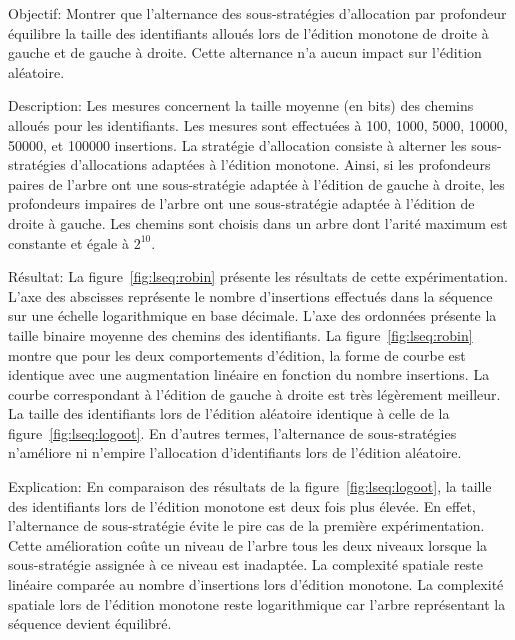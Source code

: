 \begin{asparadesc}
\item [Objectif:] Montrer que l'alternance des sous-stratégies d'allocation par
  profondeur équilibre la taille des identifiants alloués lors de l'édition
  monotone de droite à gauche et de gauche à droite. Cette alternance n'a aucun
  impact sur l'édition aléatoire.
\item [Description:] Les mesures concernent la taille moyenne (en bits) des
  chemins alloués pour les identifiants. Les mesures sont effectuées à 100,
  1000, 5000, 10000, 50000, et 100000 insertions. La stratégie d'allocation
  consiste à alterner les sous-stratégies d'allocations adaptées à l'édition
  monotone. Ainsi, si les profondeurs paires de l'arbre ont une sous-stratégie
  adaptée à l'édition de gauche à droite, les profondeurs impaires de l'arbre
  ont une sous-stratégie adaptée à l'édition de droite à gauche. Les chemins
  sont choisis dans un arbre dont l'arité maximum est constante et égale à
  $2^{10}$.
\item [Résultat:] La figure~\ref{fig:lseq:robin} présente les résultats de cette
  expérimentation. L'axe des abscisses représente le nombre d'insertions
  effectués dans la séquence sur une échelle logarithmique en base
  décimale. L'axe des ordonnées présente la taille binaire moyenne des chemins
  des identifiants. La figure~\ref{fig:lseq:robin} montre que pour les deux
  comportements d'édition, la forme de courbe est identique avec une
  augmentation linéaire en fonction du nombre insertions. La courbe
  correspondant à l'édition de gauche à droite est très légèrement meilleur. La
  taille des identifiants lors de l'édition aléatoire identique à celle de la
  figure~\ref{fig:lseq:logoot}. En d'autres termes, l'alternance de
  sous-stratégies n'améliore ni n'empire l'allocation d'identifiants lors de
  l'édition aléatoire.
\item [Explication:] En comparaison des résultats de la
  figure~\ref{fig:lseq:logoot}, la taille des identifiants lors de l'édition
  monotone est deux fois plus élevée. En effet, l'alternance de sous-stratégie
  évite le pire cas de la première expérimentation. Cette amélioration coûte un
  niveau de l'arbre tous les deux niveaux lorsque la sous-stratégie assignée à
  ce niveau est inadaptée. La complexité spatiale reste linéaire comparée au
  nombre d'insertions lors d'édition monotone. La complexité spatiale lors de
  l'édition monotone reste logarithmique car l'arbre représentant la séquence
  devient équilibré.
\end{asparadesc}

